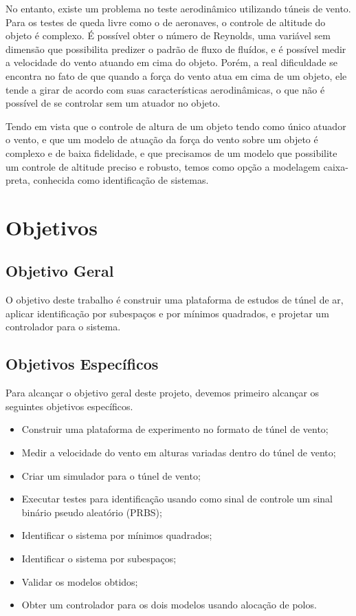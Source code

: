 No entanto, existe um problema no teste aerodinâmico utilizando túneis de vento. Para os testes de queda livre como o de aeronaves, o controle de altitude do objeto é complexo. É possível obter o número de Reynolds, uma variável sem dimensão que possibilita predizer o padrão de fluxo de fluídos, e é possível medir a velocidade do vento atuando em cima do objeto. Porém, a real dificuldade se encontra no fato de que quando a força do vento atua em cima de um objeto, ele tende a girar \cite{briggs1959} de acordo com suas características aerodinâmicas, o que não é possível de se controlar sem um atuador no objeto.


Tendo em vista que o controle de altura de um objeto tendo como único atuador o vento, e que um modelo de atuação da força do vento sobre um objeto é complexo e de baixa fidelidade, e que precisamos de um modelo que possibilite um controle de altitude preciso e robusto, temos como opção a modelagem caixa-preta, conhecida como identificação de sistemas.


\section{Objetivos}

\subsection{Objetivo Geral}

O objetivo deste trabalho é construir uma plataforma de estudos de túnel de ar, aplicar identificação por subespaços e por mínimos quadrados, e projetar um controlador para o sistema.

\subsection{Objetivos Específicos}

Para alcançar o objetivo geral deste projeto, devemos primeiro alcançar os seguintes objetivos específicos.

\begin{itemize}
	\item Construir uma plataforma de experimento no formato de túnel de vento;
	\item Medir a velocidade do vento em alturas variadas dentro do túnel de vento;
	\item Criar um simulador para o túnel de vento;
	\item Executar testes para identificação usando como sinal de controle um sinal binário pseudo aleatório (PRBS);
	\item Identificar o sistema por mínimos quadrados;
	\item Identificar o sistema por subespaços;
	\item Validar os modelos obtidos;
	\item Obter um controlador para os dois modelos usando alocação de polos.
\end{itemize}

